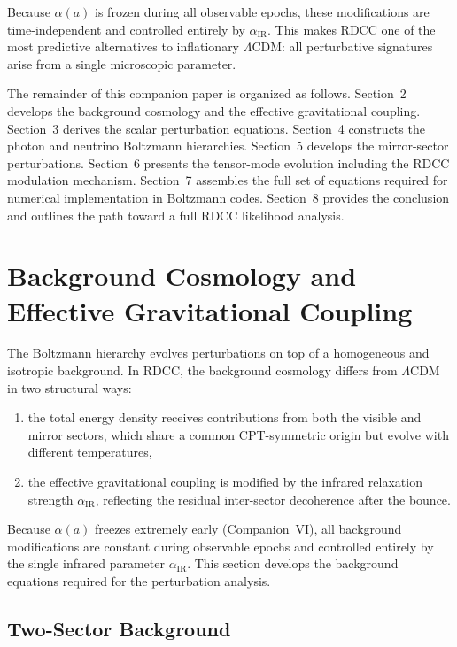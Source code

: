 \documentclass[11pt,a4paper]{article}
\begin{document}
Because $\alpha(a)$ is frozen during all observable epochs, these modifications are
time-independent and controlled entirely by $\alpha_{\mathrm{IR}}$. This makes RDCC one of the
most predictive alternatives to inflationary $\Lambda$CDM: all perturbative signatures arise
from a single microscopic parameter.

The remainder of this companion paper is organized as follows. Section~2 develops the
background cosmology and the effective gravitational coupling. Section~3 derives the scalar
perturbation equations. Section~4 constructs the photon and neutrino Boltzmann hierarchies.
Section~5 develops the mirror-sector perturbations. Section~6 presents the tensor-mode
evolution including the RDCC modulation mechanism. Section~7 assembles the full set of
equations required for numerical implementation in Boltzmann codes. Section~8 provides the
conclusion and outlines the path toward a full RDCC likelihood analysis.


\section{Background Cosmology and Effective Gravitational Coupling}

The Boltzmann hierarchy evolves perturbations on top of a homogeneous and isotropic
background. In RDCC, the background cosmology differs from $\Lambda$CDM in two
structural ways:

\begin{enumerate}
    \item the total energy density receives contributions from both the visible and mirror
    sectors, which share a common CPT-symmetric origin but evolve with different
    temperatures,
    \item the effective gravitational coupling is modified by the infrared relaxation strength
    $\alpha_{\mathrm{IR}}$, reflecting the residual inter-sector decoherence after the bounce.
\end{enumerate}

Because $\alpha(a)$ freezes extremely early (Companion~VI), all background modifications
are constant during observable epochs and controlled entirely by the single infrared parameter
$\alpha_{\mathrm{IR}}$. This section develops the background equations required for the perturbation
analysis.

\subsection{Two-Sector Background}
\end{document}
